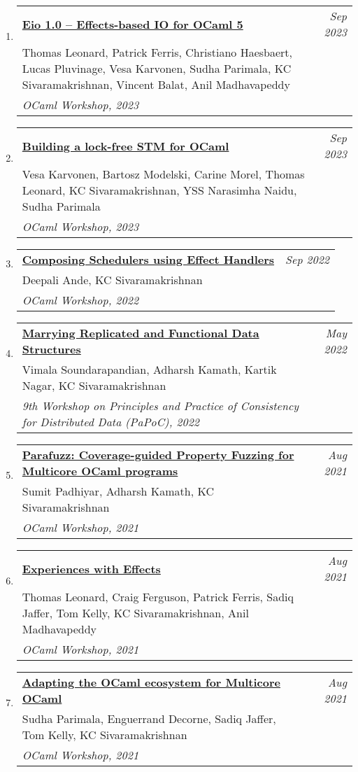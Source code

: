 \documentclass[10pt]{article}
\makeatletter
\newcommand{\lbar}[1]{{\color{#1}\ding{118}}\hspace*{2pt}}
\newenvironment{benumerate}[2]{
    \let\oldItem\item
    \def\item{\addtocounter{enumi}{-2}\oldItem}
    \begin{enumerate}[#2] \itemsep3pt
    \setcounter{enumi}{#1}
    \addtocounter{enumi}{1}}
  {\end{enumerate}}
\newenvironment{publication}[5]
{ \item
  \begin{tabular*}{7.5in}{p{6.3in}@{\extracolsep{\fill}}r}
    \href{#1}{\textbf{#2}} & \textit{#3}\\ #4 &\\ \textit{#5}&\\
  \end{tabular*}
} {}
\newenvironment{region}[3]{%
  \vspace*{0.5ex}
  {\scalebox{1.4}{\textbf{#1}}}
  \begin{benumerate}{#3}{\color{RoyalBlue}#2}}
  {\end{benumerate}\vspace{0.8ex}}
\makeatother
\begin{document}
\begin{region} {\lbar{purple}Workshop Publications}{{W}1}{23}

  \begin{publication}{https://kcsrk.info/papers/eio_ocaml23a.pdf}
		{Eio 1.0 – Effects-based IO for OCaml 5}
    {Sep 2023}{Thomas Leonard, Patrick Ferris, Christiano Haesbaert, Lucas Pluvinage, Vesa Karvonen, Sudha Parimala, KC Sivaramakrishnan, Vincent Balat, Anil Madhavapeddy}
		{OCaml Workshop, 2023}
	\end{publication}

  \begin{publication}{https://kcsrk.info/papers/kcas_ocaml23b.pdf}
    {Building a lock-free STM for OCaml}
    {Sep 2023}{Vesa Karvonen, Bartosz Modelski, Carine Morel, Thomas Leonard, KC Sivaramakrishnan, YSS Narasimha Naidu, Sudha Parimala}
		{OCaml Workshop, 2023}
	\end{publication}

	\begin{publication}{https://kcsrk.info/papers/compose_ocaml22.pdf}
		{Composing Schedulers using Effect Handlers}
		{Sep 2022}{Deepali Ande, KC Sivaramakrishnan}
		{OCaml Workshop, 2022}
	\end{publication}

	\begin{publication}{https://kcsrk.info/papers/papoc22.pdf}
		{Marrying Replicated and Functional Data Structures}
		{May 2022}{Vimala Soundarapandian, Adharsh Kamath, Kartik Nagar, KC Sivaramakrishnan}
		{9th Workshop on Principles and Practice of Consistency for Distributed Data (PaPoC), 2022}
	\end{publication}

	\begin{publication}{https://kcsrk.info/papers/ocaml2021a.pdf}
		{Parafuzz: Coverage-guided Property Fuzzing for Multicore OCaml programs}
		{Aug 2021}{Sumit Padhiyar, Adharsh Kamath, KC Sivaramakrishnan}
		{OCaml Workshop, 2021}
	\end{publication}

	\begin{publication}{https://kcsrk.info/papers/ocaml2021b.pdf}
		{Experiences with Effects}
		{Aug 2021}{Thomas Leonard, Craig Ferguson, Patrick Ferris, Sadiq Jaffer, Tom Kelly, KC Sivaramakrishnan, Anil Madhavapeddy}
		{OCaml Workshop, 2021}
	\end{publication}

	\begin{publication}{https://kcsrk.info/papers/ocaml2021c.pdf}
		{Adapting the OCaml ecosystem for Multicore OCaml}
		{Aug 2021}{Sudha Parimala, Enguerrand Decorne, Sadiq Jaffer, Tom Kelly, KC Sivaramakrishnan}
		{OCaml Workshop, 2021}
	\end{publication}


\end{region}
\end{document}
